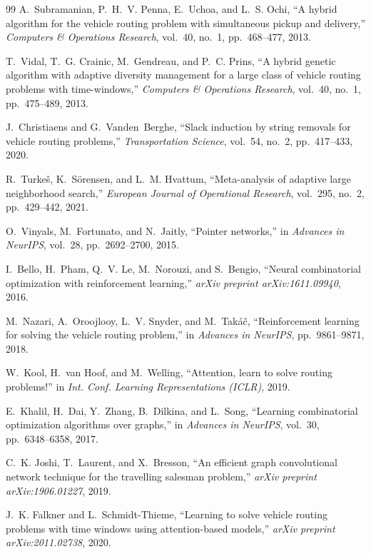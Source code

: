 \begin{thebibliography}{99}
A.~Subramanian, P.~H.~V. Penna, E.~Uchoa, and L.~S. Ochi,
``A hybrid algorithm for the vehicle routing problem with simultaneous pickup and delivery,''
\textit{Computers \& Operations Research}, vol.~40, no.~1, pp.~468--477, 2013.

T.~Vidal, T.~G. Crainic, M.~Gendreau, and P.~C. Prins,
``A hybrid genetic algorithm with adaptive diversity management for a large class of vehicle routing problems with time-windows,''
\textit{Computers \& Operations Research}, vol.~40, no.~1, pp.~475--489, 2013.

J.~Christiaens and G.~Vanden~Berghe,
``Slack induction by string removals for vehicle routing problems,''
\textit{Transportation Science}, vol.~54, no.~2, pp.~417--433, 2020.

R.~Turke{\v{s}}, K.~S{\"o}rensen, and L.~M. Hvattum,
``Meta-analysis of adaptive large neighborhood search,''
\textit{European Journal of Operational Research}, vol.~295, no.~2, pp.~429--442, 2021.

O.~Vinyals, M.~Fortunato, and N.~Jaitly,
``Pointer networks,''
in \textit{Advances in NeurIPS}, vol.~28, pp.~2692--2700, 2015.

I.~Bello, H.~Pham, Q.~V. Le, M.~Norouzi, and S.~Bengio,
``Neural combinatorial optimization with reinforcement learning,''
\textit{arXiv preprint arXiv:1611.09940}, 2016.

M.~Nazari, A.~Oroojlooy, L.~V. Snyder, and M.~Tak\'{a}\v{c},
``Reinforcement learning for solving the vehicle routing problem,''
in \textit{Advances in NeurIPS}, pp.~9861--9871, 2018.

W.~Kool, H.~van Hoof, and M.~Welling,
``Attention, learn to solve routing problems!''
in \textit{Int. Conf. Learning Representations (ICLR)}, 2019.

E.~Khalil, H.~Dai, Y.~Zhang, B.~Dilkina, and L.~Song,
``Learning combinatorial optimization algorithms over graphs,''
in \textit{Advances in NeurIPS}, vol.~30, pp.~6348--6358, 2017.

C.~K. Joshi, T.~Laurent, and X.~Bresson,
``An efficient graph convolutional network technique for the travelling salesman problem,''
\textit{arXiv preprint arXiv:1906.01227}, 2019.

J.~K. Falkner and L.~Schmidt-Thieme,
``Learning to solve vehicle routing problems with time windows using attention-based models,''
\textit{arXiv preprint arXiv:2011.02738}, 2020.


\end{thebibliography}
